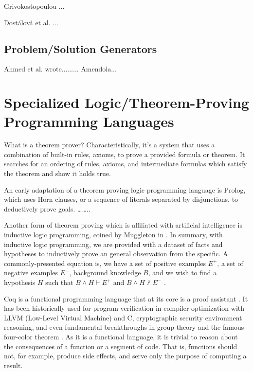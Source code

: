 \documentclass[ms]{uncgdissertationexp2}
\theoremstyle{plain}
\theoremstyle{definition}
\theoremstyle{remark}
\begin{document}
Grivokostopoulou \cite{grivokostopoulou}...

Dost\'alov\'a et al. \cite{organon}...

\subsection{Problem/Solution Generators}
Ahmed et al. wrote.........
Amendola... \cite{hardrandom}

\section{Specialized Logic/Theorem-Proving Programming Languages}
What is a theorem prover? Characteristically, it's a system that uses a combination of built-in rules, axioms, to prove a provided formula or theorem. It searches for an ordering of rules, axioms, and intermediate formulas which satisfy the theorem and show it holds true. 

An early adaptation of a theorem proving logic programming language is Prolog, which uses Horn clauses, or a sequence of literals separated by disjunctions, to deductively prove goals. ……..

Another form of theorem proving which is affiliated with artificial intelligence is inductive logic programming, coined by Muggleton in \cite{muggleton}. In summary, with inductive logic programming, we are provided with a dataset of facts and hypotheses to inductively prove an general observation from the specific. A commonly-presented equation is, we have a set of positive examples $E^+$, a set of negative examples $E^-$, background knowledge $B$, and we wish to find a hypothesis $H$ such that $B \land H \vdash E^+$ and $B \land H \nvdash E^-$ \cite{bratko}.

Coq is a functional programming language that at its core is a proof assistant \cite{softwarefoundations}. It has been historically used for program verification in compiler optimization with LLVM (Low-Level Virtual Machine) and C, cryptographic security environment reasoning, and even fundamental breakthroughs in group theory and the famous four-color theorem \cite{fourcolortheorem}. As it is a functional language, it is trivial to reason about the consequences of a function or a segment of code. That is, functions should not, for example, produce side effects, and serve only the purpose of computing a result.
\end{document}
